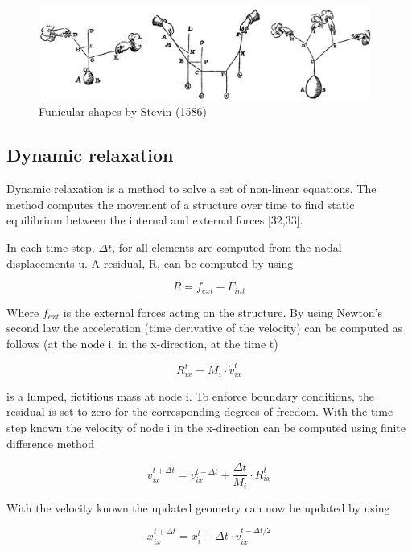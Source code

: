 \begin{figure}
  \includegraphics[width=310pt]{graphics/stevin.png}
  \caption{Funicular shapes by Stevin (1586)}
  \label{fig:Stevin}
\end{figure}

\subsection{Dynamic relaxation}
\label{sec:dr}
Dynamic relaxation is a method to solve a set of non-linear equations. The method computes the movement of a structure over time to find static equilibrium between the internal and external forces [32,33]. 

In each time step,  $\Delta t$, for all elements are computed from the nodal displacements u. A residual, R, can be computed by using 

\begin{equation*}
  R = f_{ext} - F_{int} 
\end{equation*}

Where $f_{ext}$ is the external forces acting on the structure. By using Newton’s second law the acceleration (time derivative of the velocity) can be computed as follows (at the node i, in the x-direction, at the time t)

\begin{equation*}
  R^t_{ix} = M_i  \cdot \dot{v}^t_{ix}
\end{equation*}

 is a lumped, fictitious mass at node i. To enforce boundary conditions, the residual is set to zero for the corresponding degrees of freedom. With the time step known the velocity of node i in the x-direction can be computed using finite difference method

\begin{equation*}
  v^{t+\Delta t}_{ix} = v^{t-\Delta t}_{ix} + \frac{\Delta t}{M_i} \cdot R^t_{ix}
\end{equation*}

With the velocity known the updated geometry can now be updated by using

\begin{equation*}
  x^{t+\Delta t}_{ix} = x^t_i + \Delta t \cdot v_{ix}^{t-\Delta t / 2}
\end{equation*}

